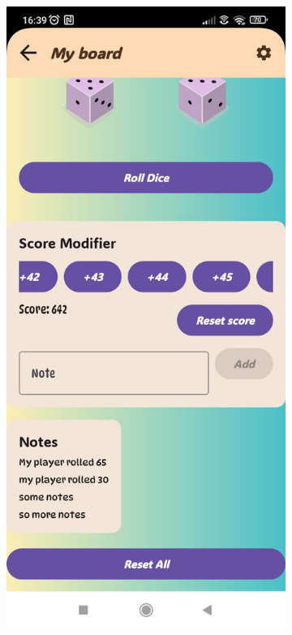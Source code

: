 \begin{figure}[ht!]
    \centering
    \begin{subfigure}[b]{0.27\textwidth}
        \includegraphics[width=\textwidth]{img/custom game.jpg}

\end{subfigure}
\end{figure}
